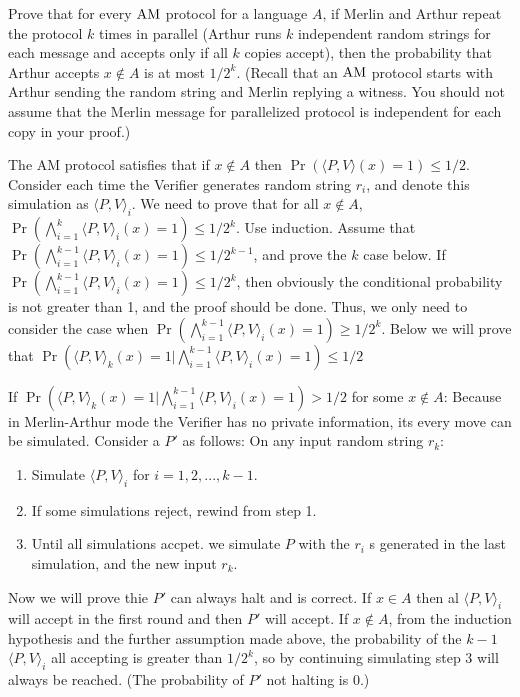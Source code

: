 \documentclass{homework}
\begin{document}
\begin{problem}
  Prove that for every $\textup{AM}$ protocol for a language $A$, if Merlin and Arthur
  repeat the protocol $k$ times in parallel (Arthur runs $k$ independent random
  strings for each message and accepts only if all $k$ copies accept), then the
  probability that Arthur accepts $x \not\in A$ is at most $1/2^{k}$.
  (Recall that an $\textup{AM}$ protocol starts with Arthur sending the random string
  and Merlin replying a witness.
  You should not assume that the Merlin message for parallelized protocol is
  independent for each copy in your proof.)
\end{problem}

\begin{solution}
The AM protocol satisfies that if $x\not\in A$ then $\Pr(\langle P,V\rangle(x)=1)\le 1/2$. Consider each time the Verifier generates random string $r_i$, and denote this simulation as $\langle P,V\rangle_i$. We need to prove that for all $x\not\in A$, $\Pr(\bigwedge_{i=1}^k \langle P,V\rangle_i(x)=1)\le 1/2^k$. Use induction. Assume that $\Pr(\bigwedge_{i=1}^{k-1} \langle P,V\rangle_i(x)=1)\le 1/2^{k-1}$, and prove the $k$ case below. If $\Pr(\bigwedge_{i=1}^{k-1} \langle P,V\rangle_i(x)=1)\le 1/2^k$, then obviously the conditional probability is not greater than 1, and the proof should be done. Thus, we only need to consider the case when $\Pr(\bigwedge_{i=1}^{k-1} \langle P,V\rangle_i(x)=1)\ge 1/2^k$. Below we will prove that $\Pr(\langle P,V\rangle_k(x)=1|\bigwedge_{i=1}^{k-1} \langle P,V\rangle_i(x)=1)\le 1/2$

If $\Pr(\langle P,V\rangle_k(x)=1|\bigwedge_{i=1}^{k-1} \langle P,V\rangle_i(x)=1) > 1/2$ for some $x\not\in A$: Because in Merlin-Arthur mode the Verifier has no private information, its every move can be simulated. Consider a $P'$ as follows: On any input random string $r_k$:
\begin{enumerate}
  \item Simulate $\langle P,V\rangle_i$ for $i=1,2,...,k-1$.
  \item If some simulations reject, rewind from step 1.
  \item Until all simulations accpet. we simulate $P$ with the $r_i$ s generated in the last simulation, and the new input $r_k$.
\end{enumerate}
Now we will prove thie $P'$ can always halt and is correct. If $x\in A$ then al $\langle P,V\rangle_i$ will accept in the first round and then $P'$ will accept. If $x\not\in A$, from the induction hypothesis and the further assumption made above, the probability of the $k-1$ $\langle P,V\rangle_i$ all accepting is greater than $1/2^k$, so by continuing simulating step 3 will always be reached. (The probability of $P'$ not halting is $0$.)


\end{solution}
\end{document}
